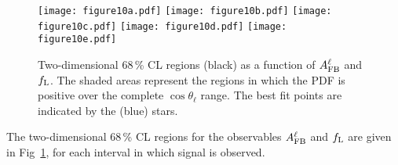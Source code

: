 \begin{figure}[htbp]
\centering
\texttt{[image: figure10a.pdf]}
\texttt{[image: figure10b.pdf]}
\texttt{[image: figure10c.pdf]}
\texttt{[image: figure10d.pdf]}
\texttt{[image: figure10e.pdf]}
\caption{Two-dimensional 68\,\% CL regions (black) as a
  function of $A_{\rm FB}^\ell$ and $f_{\rm L}$.  The shaded areas
  represent the regions in which the PDF is positive over the complete $\cos
  \theta_{\ell}$ range. The best fit points are indicated by the (blue) stars. }
\label{fig:contours}
\end{figure}

The two-dimensional 68\,\% CL regions for the observables 
$A_{\rm FB}^\ell$ and $f_{\rm L}$ are given in Fig~\ref{fig:contours},
for each \qsq interval in which signal is observed.
